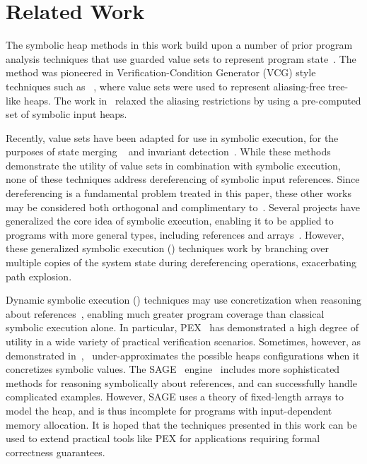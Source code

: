 \section{Related Work}
\label{sec:related}
%
The symbolic heap methods in this work build upon a
number of prior program analysis techniques that use guarded value sets to
represent program
state~\cite{Sen:2014,Torlak:2014,Yorsh:2008,Xie:2005,Dillig:2011,Elkarablieh:2009}. 
The method was pioneered in Verification-Condition Generator (VCG) style techniques such as ~\cite{Xie:2005,Yorsh:2008}, where value sets were used to 
represent aliasing-free tree-like heaps. The work in~\cite{Dillig:2011} relaxed the aliasing restrictions by using a pre-computed set of symbolic input heaps.

Recently, value sets have been adapted for use in symbolic execution, for the purposes of state merging ~\cite{Sen:2014,Torlak:2014} and invariant detection~\cite{Ferrara:2014}. While these methods demonstrate the utility of value sets in combination with symbolic execution, none of these techniques address dereferencing of symbolic input references. Since dereferencing is a fundamental problem treated in this paper, these other works may be considered both orthogonal and complimentary to~\symtxt{}.
%
Several projects have generalized the core idea of symbolic execution,
enabling it to be applied to programs with more general types,
including references and
arrays~\cite{GSE03,KiasanKunit,Cadar:2008,Rosner:2015}. However, these
generalized symbolic execution (\gsetxt{}) techniques work by branching over
multiple copies of the system state during dereferencing operations,
exacerbating path explosion.

Dynamic symbolic execution (\dsetxt{}) techniques may use
concretization when reasoning about references~\cite{Godefroid:2005,Sen:2005,Godefroid:POPL07,Tillmann:2008}, enabling much greater program
coverage than classical symbolic execution alone. In particular, PEX~\cite{Tillmann:2008}
has demonstrated a high degree of utility in a wide variety of 
practical verification scenarios. Sometimes,
however, as demonstrated in~\cite{Elkarablieh:2009},~\dsetxt{}
under-approximates the possible heaps configurations when it
concretizes symbolic values. The SAGE~\dsetxt{}
engine~\cite{Elkarablieh:2009} includes more sophisticated methods for
reasoning symbolically about references, and can successfully handle
complicated examples. However, SAGE uses a
theory of fixed-length arrays to model the heap, and is thus incomplete
for programs with input-dependent memory allocation. It is hoped that the 
techniques presented in this work can be used to extend practical tools 
like PEX for applications requiring formal correctness guarantees.


